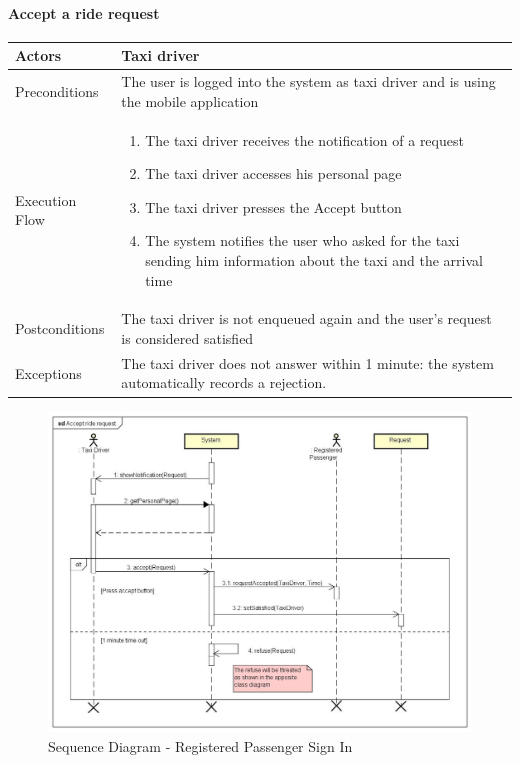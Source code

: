 \paragraph{Accept a ride request}
\begin{center}
	\begin{tabular}{ | l | p{8cm} |}
		\hline Actors & Taxi driver
		\\ \hline
		Preconditions &
		The user is logged into the system as taxi driver and is using the mobile application
		\\ \hline
		Execution Flow &
		\begin{enumerate}
			\item The taxi driver receives the notification of a request
			\item The taxi driver accesses his personal page
			\item The taxi driver presses the Accept button
			\item The system notifies the user who asked for the taxi sending him
			information about the taxi and the arrival time
		\end{enumerate}
		\\ \hline
		Postconditions & The taxi driver is not enqueued again and the user's request
		is considered satisfied
		\\ \hline
		Exceptions &
		The taxi driver does not answer within 1 minute:
		the system automatically records a rejection.
		\\ \hline
	\end{tabular}
\end{center}
\newpage
\begin{landscape}
\begin{figure}[!h]
	\begin{center}			
		\includegraphics[height=\textheight]{../SE2_SD/AcceptRideRequest}
		\caption{Sequence Diagram - Registered Passenger Sign In}	
	\end{center}
\end{figure}
\end{landscape}
\newpage
